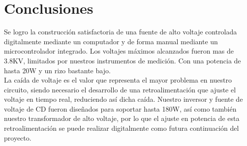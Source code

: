 \chapter{Conclusiones}
Se logro la construcción satisfactoria de una fuente de alto voltaje controlada digitalmente mediante un computador y de forma manual mediante un microcontrolador integrado. Los voltajes máximos alcanzados fueron mas de 3.8KV, limitados por nuestros instrumentos de medición. Con una potencia de hasta 20W y un rizo bastante bajo.\\

La caída de voltaje es el valor que representa el mayor problema en nuestro circuito, siendo necesario el desarrollo de una retroalimentación que ajuste el voltaje en tiempo real, reduciendo así dicha caída. Nuestro inversor y fuente de voltaje de CD fueron diseñados para soportar hasta 180W, así como también nuestro transformador de alto voltaje, por lo que el ajuste en potencia de esta retroalimentación se puede realizar digitalmente como futura continuación del proyecto.